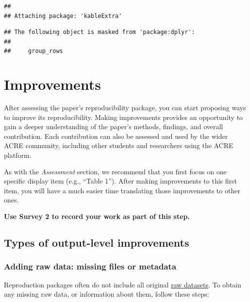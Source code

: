 \documentclass[]{book}
\begin{document}
\begin{verbatim}
## 
## Attaching package: 'kableExtra'
\end{verbatim}

\begin{verbatim}
## The following object is masked from 'package:dplyr':
## 
##     group_rows
\end{verbatim}

\hypertarget{improvements}{%
\chapter{Improvements}\label{improvements}}

After assessing the paper's reproducibility package, you can start proposing ways to improve its reproducibility. Making improvements provides an opportunity to gain a deeper understanding of the paper's methods, findings, and overall contribution. Each contribution can also be assessed and used by the wider ACRE community, including other students and researchers using the ACRE platform.

As with the \emph{Assessment} section, we recommend that you first focus on one specific display item (e.g., ``Table 1''). After making improvements to this first item, you will have a much easier time translating those improvements to other ones.

\textbf{Use Survey 2 to record your work as part of this step.}

\hypertarget{types-of-output-level-improvements}{%
\section{Types of output-level improvements}\label{types-of-output-level-improvements}}

\hypertarget{rd}{%
\subsection{Adding raw data: missing files or metadata}\label{rd}}

Reproduction packages often do not include all original \protect\hyperlink{describe-inputs}{raw datasets}. To obtain any missing raw data, or information about them, follow these steps:
\end{document}
